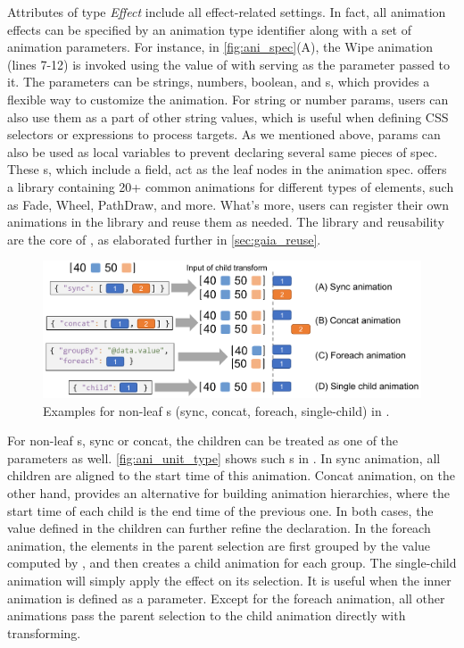 Attributes of type \textit{Effect} include all effect-related settings.
In fact, all animation effects can be specified by an animation type identifier along with a set of animation parameters.
For instance, in \autoref{fig:ani_spec}(A), the Wipe animation (lines 7-12) is invoked using the value of  with  serving as the parameter passed to it. 
The parameters can be strings, numbers, boolean, and \aniunit{}s, which provides a flexible way to customize the animation.
For string or number params, users can also use them as a part of other string values, which is useful when defining CSS selectors or expressions to process targets.
As we mentioned above, params can also be used as local variables to prevent declaring several same pieces of spec.
These \aniunit{}s, which include a  field, act as the leaf nodes in the animation spec. 
\gaia{} offers a library containing 20+ common animations for different types of elements, such as Fade, Wheel, PathDraw, and more. 
What's more, users can register their own animations in the library and reuse them as needed. 
The library and reusability are the core of \gaia{}, as elaborated further in \autoref{sec:gaia_reuse}.

\begin{figure}[h]
  \centering
  \includegraphics[width=\linewidth]{figs/ani_unit_type.pdf}
  \caption{
    Examples for non-leaf \aniunit{}s (sync, concat, foreach, single-child) in \gaia{}.
  }
  \label{fig:ani_unit_type}
\end{figure}

For non-leaf \aniunit{}s, \eg sync or concat, the children can be treated as one of the parameters as well.
\autoref{fig:ani_unit_type} shows such \aniunit{}s in \gaia{}.
In sync animation, all children are aligned to the start time of this animation.
Concat animation, on the other hand, provides an alternative for building animation hierarchies, where the start time of each child is the end time of the previous one.
In both cases, the  value defined in the children can further refine the declaration.
In the foreach animation, the elements in the parent selection are first grouped by the value computed by , and then \gaia{} creates a child animation for each group.
The single-child animation will simply apply the effect on its selection.
It is useful when the inner animation is defined as a parameter.
Except for the foreach animation, all other animations pass the parent selection to the child animation directly with transforming.
